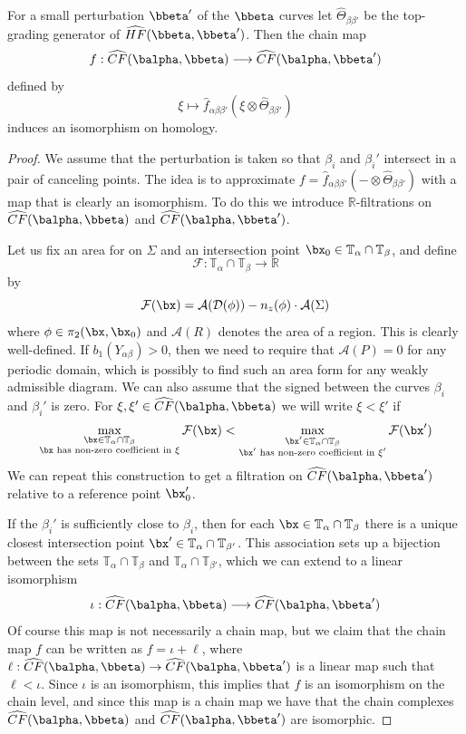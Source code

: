 \begin{prop}
\label{quasi-isomorphism from small perturbation of beta curves}
For a small perturbation $\bbeta'$ of the $\bbeta$ curves let $\widehat{\Theta}_{\beta\beta'}$ be the top-grading generator of $\widehat{HF}(\bbeta,\bbeta')$. Then the chain map
\[ f : \widehat{CF}(\balpha,\bbeta) \longrightarrow \widehat{CF}(\balpha,\bbeta') \]
defined by
\[ \xi \mapsto \widehat{f}_{\alpha\beta\beta'}(\xi \otimes \widehat{\Theta}_{\beta\beta'}) \]
induces an isomorphism on homology.
\end{prop}
\begin{proof}
We assume that the perturbation is taken so that $\beta_i$ and $\beta_i'$ intersect in a pair of canceling points. The idea is to approximate $f = \widehat{f}_{\alpha\beta\beta'}( - \otimes \widehat{\Theta}_{\beta\beta'})$ with a map that is clearly an isomorphism. To do this we introduce $\mathbb R$-filtrations on $\widehat{CF}(\balpha,\bbeta)$ and $\widehat{CF}(\balpha,\bbeta')$.

Let us fix an area for on $\Sigma$ and an intersection point $\bx_0 \in \mathbb T_\alpha \cap \mathbb T_\beta$, and define
\[ \mathcal F : \mathbb T_\alpha \cap \mathbb T_\beta \longrightarrow \mathbb R \]
by
\[ \mathcal F(\bx) = \mathcal A(\mathcal D(\phi)) - n_z(\phi) \cdot \mathcal A(\Sigma) \]
where $\phi \in \pi_2(\bx,\bx_0)$ and $\mathcal A(R)$ denotes the area of a region. This is clearly well-defined. If $b_1(Y_{\alpha\beta})>0$, then we need to require that $\mathcal A(P)=0$ for any periodic domain, which is possibly to find such an area form for any weakly admissible diagram. We can also assume that the signed between the curves $\beta_i$ and $\beta_i'$ is zero. For $\xi,\xi' \in \widehat{CF}(\balpha,\bbeta)$ we will write $\xi < \xi'$ if 
\[ \max_{\substack{\bx \in \mathbb T_\alpha \cap \mathbb T_\beta \\ \bx \text{ has non-zero coefficient in } \xi}} \mathcal F(\bx) < \max_{\substack{\bx' \in \mathbb T_\alpha \cap \mathbb T_\beta \\ \bx' \text{ has non-zero coefficient in } \xi'}} \mathcal F(\bx') \]
We can repeat this construction to get a filtration on $\widehat{CF}(\balpha,\bbeta')$ relative to a reference point $\bx_0'$. 

If the $\beta_i'$ is sufficiently close to $\beta_i$, then for each $\bx \in \mathbb T_\alpha \cap \mathbb T_\beta$ there is a unique closest intersection point $\bx' \in \mathbb T_\alpha \cap \mathbb T_{\beta'}$. This association sets up a bijection between the sets $\mathbb T_\alpha \cap \mathbb T_\beta$ and $\mathbb T_\alpha \cap \mathbb T_{\beta'}$, which we can extend to a linear isomorphism
\[ \iota : \widehat{CF}(\balpha,\bbeta) \longrightarrow \widehat{CF}(\balpha,\bbeta') \]
Of course this map is not necessarily a chain map, but we claim that the chain map $f$ can be written as $f = \iota + \ell$, where $\ell : \widehat{CF}(\balpha,\bbeta) \rightarrow \widehat{CF}(\balpha,\bbeta')$ is a linear map such that $\ell < \iota$. Since $\iota$ is an isomorphism, this implies that $f$ is an isomorphism on the chain level, and since this map is a chain map we have that the chain complexes $\widehat{CF}(\balpha,\bbeta)$ and $\widehat{CF}(\balpha,\bbeta')$ are isomorphic.


\end{proof}
